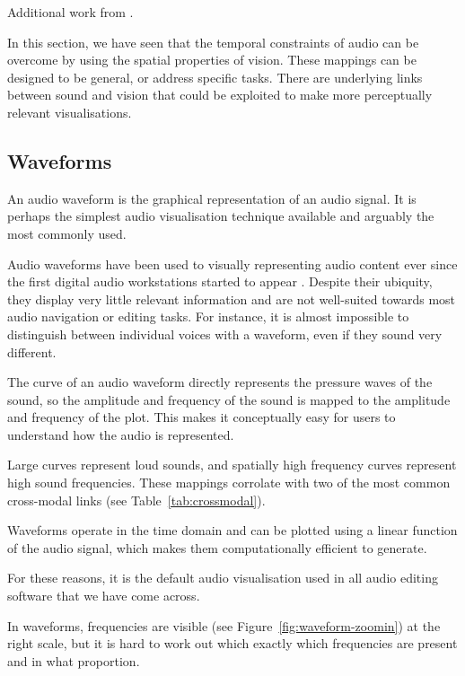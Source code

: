 Additional work from \citet{Marks2003}.


In this section, we have seen that the temporal constraints of audio can be overcome by using the spatial properties of
vision. These mappings can be designed to be general, or address specific tasks. There are underlying links between
sound and vision that could be exploited to make more perceptually relevant visualisations.

\subsection{Waveforms}

An audio waveform is the graphical representation of an audio signal. It is perhaps the simplest audio visualisation
technique available and arguably the most commonly used.

Audio waveforms have been used to visually representing audio content ever since the first digital audio workstations
started to appear \citep{Massie1985}. Despite their ubiquity, they display very little relevant information and are not
well-suited towards most audio navigation or editing tasks. For instance, it is almost impossible to distinguish
between individual voices with a waveform, even if they sound very different.


The curve of an audio waveform directly represents the pressure waves of the sound, so the amplitude and frequency of
the sound is mapped to the amplitude and frequency of the plot. This makes it conceptually easy for users to
understand how the audio is represented.

Large curves represent loud sounds, and spatially high frequency curves represent high sound frequencies. These
mappings corrolate with two of the most common cross-modal links (see Table~\ref{tab:crossmodal}).

Waveforms operate in the time domain and can be plotted using a linear function of the audio signal, which makes them
computationally efficient to generate. 

For these reasons, it is the default audio visualisation used in all audio editing software that we have come across.


In waveforms, frequencies are visible (see Figure~\ref{fig:waveform-zoomin}) at the right scale, but it is hard to work
out which exactly which frequencies are present and in what proportion.

